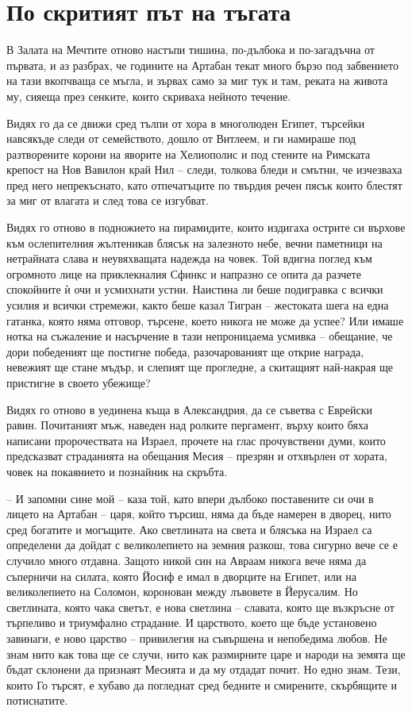 \part{По скритият път на тъгата}

В Залата на Мечтите отново настъпи тишина, по-дълбока и по-загадъчна от първата,
и аз разбрах, че годините на Артабан текат много бързо под забвението на тази
вкопчваща се мъгла, и зървах само за миг тук и там, реката на живота му, сияеща
през сенките, които скриваха нейното течение.

Видях го да се движи сред тълпи от хора в многолюден Египет, търсейки навсякъде
следи от семейството, дошло от Витлеем, и ги намираше под разтворените корони на
яворите на Хелиополис и под стените на Римската крепост на Нов Вавилон край Нил
-- следи, толкова бледи и смътни, че изчезваха пред него непрекъснато, като
отпечатъците по твърдия речен пясък които блестят за миг от влагата и след това
се изгубват.

Видях го отново в подножието на пирамидите, които издигаха острите си върхове
към ослепителния жълтеникав блясък на залезното небе, вечни паметници на
нетрайната слава и неувяхващата надежда на човек. Той вдигна поглед към
огромното лице на приклекналия Сфинкс и напразно се опита да разчете спокойните
ѝ очи и усмихнати устни. Наистина ли беше подигравка с всички усилия и всички
стремежи, както беше казал Тигран -- жестоката шега на една гатанка, която няма
отговор, търсене, което никога не може да успее? Или имаше нотка на съжаление и
насърчение в тази непроницаема усмивка -- обещание, че дори победеният ще
постигне победа, разочарованият ще открие награда, невежият ще стане мъдър, и
слепият ще прогледне, а скитащият най-накрая ще пристигне в своето убежище?

Видях го отново в уединена къща в Александрия, да се съветва с Еврейски равин.
Почитаният мъж, наведен над ролките пергамент, върху които бяха написани
пророчествата на Израел, прочете на глас прочувствени думи, които предсказват
страданията на обещания Месия -- презрян и отхвърлен от хората, човек на
покаянието и познайник на скръбта.

-- И запомни сине мой -- каза той, като впери дълбоко поставените си очи в
лицето на Артабан -- царя, който търсиш, няма да бъде намерен в дворец, нито
сред богатите и могъщите. Ако светлината на света и блясъка на Израел са
определени да дойдат с великолепието на земния разкош, това сигурно вече се е
случило много отдавна. Защото никой син на Авраам никога вече няма да съперничи
на силата, която Йосиф е имал в дворците на Египет, или на великолепието на
Соломон, коронован между лъвовете в Йерусалим. Но светлината, която чака светът,
е нова светлина -- славата, която ще възкръсне от търпеливо и триумфално
страдание. И царството, което ще бъде установено завинаги, е ново царство --
привилегия на съвършена и непобедима любов. Не знам нито как това ще се случи,
нито как размирните царе и народи на земята ще бъдат склонени да признаят
Месията и да му отдадат почит. Но едно знам. Тези, които Го търсят, е хубаво да
погледнат сред бедните и смирените, скърбящите и потиснатите.

